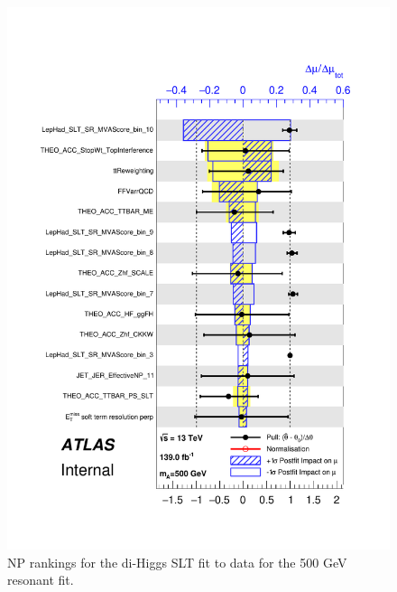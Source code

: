 \begin{figure}
\centering
\includegraphics[width=.8\textwidth]{figures/results/HH/LepHad/pulls_SigXsecOverSM_500_SLT.pdf}
\caption{NP rankings for the di-Higgs \lephad SLT fit to data for the 500 GeV resonant fit.}
\label{fig:LepHadPostfitNPRankings2HDM500SLT}
\end{figure}

